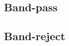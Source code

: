 \documentclass[american, twoside]{article}
\begin{document}
\subsection{Band-pass} \label{Butterworth:Bandpass}
\subsection{Band-reject} \label{Butterworth:Bandreject}

\newpage
\printglossaries

\newpage
\printbibliography[heading=bibintoc]
\end{document}
